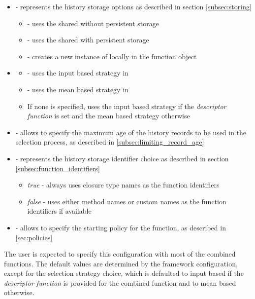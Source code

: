 \begin{itemize}
	\item {} - represents the history storage options as described in section \ref{subsec:storing}
	\begin{itemize}
		\item {} - uses the shared  without persistent storage
		\item {} - uses the shared  with persistent storage
		\item {} - creates a new instance of  locally in the function object
	\end{itemize}
\item {}
\begin{itemize}
	\item {} - uses the input based strategy in 
	\item {} - uses the mean based strategy in 
	\item If none is specified, uses the input based strategy if the \textit{descriptor function} is set and the mean based strategy otherwise
\end{itemize}
\item {} - allows to specify the maximum age of the history records to be used in the selection process, as described in \ref{subsec:limiting_record_age}
\item {} - represents the history storage identifier choice as described in section \ref{subsec:function_identifiers}
\begin{itemize}
	\item \textit{true} - always uses closure type names as the function identifiers
	\item \textit{false} - uses either method names or custom names as the function identifiers if available
\end{itemize}
\item {} - allows to specify the starting policy for the function, as described in \ref{sec:policies}
\end{itemize}

The user is expected to specify this configuration with most of the combined functions. The default values are determined by the framework configuration, except for the selection strategy choice, which is defaulted to input based if the \textit{descriptor function} is provided for the combined function and to mean based otherwise.

